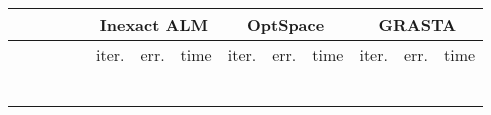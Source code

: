 \documentclass[twocolumn]{svjour3}
\begin{document}
\begin{table*}[!htp]
\begin{center}
\begin{tabular}{|c|c|c|c|c|c|c|c|c|c|c|c|c|c|}
\hline \hline \hline
\multicolumn{4}{c|}{} & & \multicolumn{3}{|c|}{Inexact ALM} & \multicolumn{3}{|c|}{OptSpace} & \multicolumn{3}{|c}{GRASTA} \\
\hline \hline
\multicolumn{1}{c}{} & \multicolumn{1}{c}{} & \multicolumn{1}{c}{} & \multicolumn{1}{c|}{} & & 
\multicolumn{1}{|c}{\rm{iter.}} & \multicolumn{1}{c}{\rm{err.}} & \multicolumn{1}{c|}{\rm{time}} &
\multicolumn{1}{|c}{\rm{iter.}} & \multicolumn{1}{c}{\rm{err.}} & \multicolumn{1}{c|}{\rm{time}} &
\multicolumn{1}{|c}{\rm{iter.}} & \multicolumn{1}{c}{\rm{err.}} & \multicolumn{1}{c}{\rm{time}} \\
\hline\hline
\multicolumn{1}{c}{} & \multicolumn{1}{c}{} & \multicolumn{1}{c}{} & \multicolumn{1}{c|}{} &  & 
\multicolumn{1}{|c}{} & \multicolumn{1}{c}{} & \multicolumn{1}{c|}{} &
\multicolumn{1}{|c}{} & \multicolumn{1}{c}{} & \multicolumn{1}{c|}{} &
\multicolumn{1}{|c}{} & \multicolumn{1}{c}{} & \multicolumn{1}{c}{} \\
\hline
\multicolumn{1}{c}{} & \multicolumn{1}{c}{} & \multicolumn{1}{c}{} & \multicolumn{1}{c|}{} &  & 
\multicolumn{1}{|c}{} & \multicolumn{1}{c}{} & \multicolumn{1}{c|}{} &
\multicolumn{1}{|c}{} & \multicolumn{1}{c}{} & \multicolumn{1}{c|}{} &
\multicolumn{1}{|c}{} & \multicolumn{1}{c}{} & \multicolumn{1}{c}{} \\
\hline
\multicolumn{1}{c}{} & \multicolumn{1}{c}{} & \multicolumn{1}{c}{} & \multicolumn{1}{c|}{} &  & 
\multicolumn{1}{|c}{} & \multicolumn{1}{c}{} & \multicolumn{1}{c|}{} &
\multicolumn{1}{|c}{} & \multicolumn{1}{c}{} & \multicolumn{1}{c|}{} &
\multicolumn{1}{|c}{} & \multicolumn{1}{c}{} & \multicolumn{1}{c}{} \\
\hline
\multicolumn{1}{c}{} & \multicolumn{1}{c}{} & \multicolumn{1}{c}{} & \multicolumn{1}{c|}{} &  & 
\multicolumn{1}{|c}{} & \multicolumn{1}{c}{} & \multicolumn{1}{c|}{} &
\multicolumn{1}{|c}{} & \multicolumn{1}{c}{} & \multicolumn{1}{c|}{} &
\multicolumn{1}{|c}{} & \multicolumn{1}{c}{} & \multicolumn{1}{c}{} \\
\hline
\multicolumn{1}{c}{} & \multicolumn{1}{c}{} & \multicolumn{1}{c}{} & \multicolumn{1}{c|}{} &  & 
\multicolumn{1}{|c}{} & \multicolumn{1}{c}{} & \multicolumn{1}{c|}{} &
\multicolumn{1}{|c}{} & \multicolumn{1}{c}{} & \multicolumn{1}{c|}{} &
\multicolumn{1}{|c}{} & \multicolumn{1}{c}{} & \multicolumn{1}{c}{} \\
\hline
\multicolumn{1}{c}{} & \multicolumn{1}{c}{} & \multicolumn{1}{c}{} & \multicolumn{1}{c|}{} &  & 
\multicolumn{1}{|c}{} & \multicolumn{1}{c}{} & \multicolumn{1}{c|}{} &

\end{tabular}
\end{center}
\end{table*}
\end{document}
